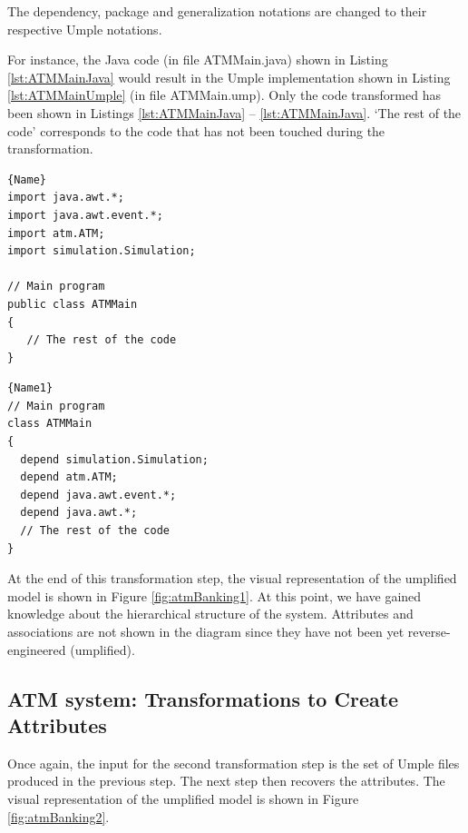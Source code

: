 The dependency, package and generalization notations are changed to their respective Umple notations.

For instance, the Java code (in file ATMMain.java) shown in Listing  \ref{lst:ATMMainJava} would result in the Umple implementation shown in Listing  \ref{lst:ATMMainUmple} (in file ATMMain.ump). Only the code transformed has been shown in Listings \ref{lst:ATMMainJava} -- \ref{lst:ATMMainJava}. `The rest of the code' corresponds to the code that has not been touched during the transformation. 

\noindent\begin{minipage}{.45\textwidth}
\begin{lstlisting}[style=java,caption=ATMMain.java,label=lst:ATMMainJava]{Name}
import java.awt.*;
import java.awt.event.*;
import atm.ATM;
import simulation.Simulation;

// Main program  
public class ATMMain
{
   // The rest of the code
}
\end{lstlisting}
\end{minipage}\hfill
\begin{minipage}{.45\textwidth}
\begin{lstlisting}[style=UmpleIn,caption=ATMMain.ump,label=lst:ATMMainUmple]{Name1}
// Main program  
class ATMMain
{
  depend simulation.Simulation;
  depend atm.ATM;
  depend java.awt.event.*;
  depend java.awt.*;
  // The rest of the code
}
\end{lstlisting}
\end{minipage}

At the end of this transformation step, the visual representation of the umplified model is shown in Figure \ref{fig:atmBanking1}. At this point, we have gained knowledge about the hierarchical structure of the system. Attributes and associations are not shown in the diagram since they have not been yet reverse-engineered (umplified).

\subsection{ATM system: Transformations to Create Attributes}

Once again, the input for the second transformation step is the set of Umple files produced in the previous step. The next step then recovers the attributes. The visual representation of the umplified model is shown in Figure \ref{fig:atmBanking2}.

